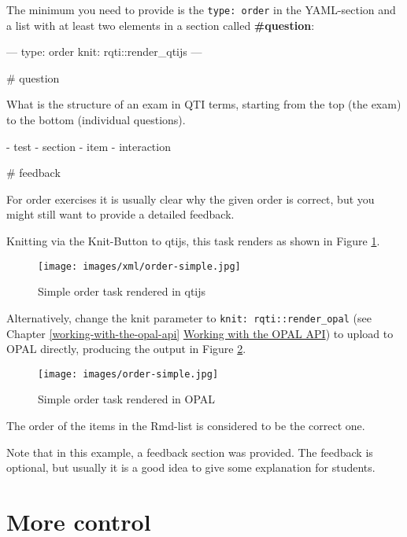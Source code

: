 \documentclass[twoside]{tufte-book}
\newenvironment{Shaded}{}{}
\begin{document}
The minimum you need to provide is the \texttt{type:\ order} in the YAML-section and a list with at least two elements in a section called \textbf{\#question}:

\begin{Shaded}
\begin{Highlighting}
---
type: order
knit: rqti::render_qtijs
---

# question

What is the structure of an exam in QTI terms, starting from the top (the exam)
to the bottom (individual questions).

- test
- section
- item
- interaction

# feedback

For order exercises it is usually clear why the given order is correct, but you
might still want to provide a detailed feedback.
\end{Highlighting}
\end{Shaded}

Knitting via the Knit-Button to qtijs, this task renders as shown in Figure \ref{order1qtijs}.

\begin{figure}
\centering
\texttt{[image: images/xml/order-simple.jpg]}
\caption{\label{order1qtijs}Simple order task rendered in qtijs}
\end{figure}

\noindent Alternatively, change the knit parameter to \texttt{knit:\ rqti::render\_opal} (see Chapter \ref{working-with-the-opal-api} \href{api_opal.html}{Working with the OPAL API}) to upload to OPAL directly, producing the output in Figure \ref{order1opal}.

\begin{figure}
\centering
\texttt{[image: images/order-simple.jpg]}
\caption{\label{order1opal}Simple order task rendered in OPAL}
\end{figure}

The order of the items in the Rmd-list is considered to be the correct one.

Note that in this example, a feedback section was provided. The feedback is
optional, but usually it is a good idea to give some explanation for students.

\section{More control}\label{more-control-5}
\end{document}
